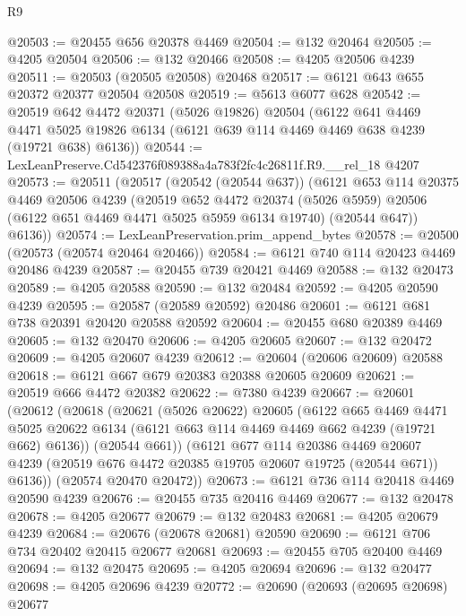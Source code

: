\begin{lexlean}{R9}
\begin{coremodule}
@20503 := @20455 @656 @20378 @4469
@20504 := @132 @20464
@20505 := @4205 @20504
@20506 := @132 @20466
@20508 := @4205 @20506 @4239
@20511 := @20503 (@20505 @20508) @20468
@20517 := @6121 @643 @655 @20372 @20377 @20504 @20508
@20519 := @5613 @6077 @628
@20542 := @20519
    @642
    @4472
    @20371
    (@5026 @19826)
    @20504
    (@6122
      @641
      @4469
      @4471
      @5025
      @19826
      @6134
      (@6121 @639 @114 @4469 @4469 @638 @4239 (@19721 @638) @6136))
@20544 := LexLeanPreserve.Cd542376f089388a4a783f2fc4c26811f.R9.__rel_18 @4207
@20573 := @20511
    (@20517
      (@20542 (@20544 @637))
      (@6121
        @653
        @114
        @20375
        @4469
        @20506
        @4239
        (@20519
          @652
          @4472
          @20374
          (@5026 @5959)
          @20506
          (@6122 @651 @4469 @4471 @5025 @5959 @6134 @19740)
          (@20544 @647))
        @6136))
@20574 := LexLeanPreservation.prim_append_bytes
@20578 := @20500 (@20573 (@20574 @20464 @20466))
@20584 := @6121 @740 @114 @20423 @4469 @20486 @4239
@20587 := @20455 @739 @20421 @4469
@20588 := @132 @20473
@20589 := @4205 @20588
@20590 := @132 @20484
@20592 := @4205 @20590 @4239
@20595 := @20587 (@20589 @20592) @20486
@20601 := @6121 @681 @738 @20391 @20420 @20588 @20592
@20604 := @20455 @680 @20389 @4469
@20605 := @132 @20470
@20606 := @4205 @20605
@20607 := @132 @20472
@20609 := @4205 @20607 @4239
@20612 := @20604 (@20606 @20609) @20588
@20618 := @6121 @667 @679 @20383 @20388 @20605 @20609
@20621 := @20519 @666 @4472 @20382
@20622 := @7380 @4239
@20667 := @20601
    (@20612
      (@20618
        (@20621
          (@5026 @20622)
          @20605
          (@6122
            @665
            @4469
            @4471
            @5025
            @20622
            @6134
            (@6121 @663 @114 @4469 @4469 @662 @4239 (@19721 @662) @6136))
          (@20544 @661))
        (@6121
          @677
          @114
          @20386
          @4469
          @20607
          @4239
          (@20519 @676 @4472 @20385 @19705 @20607 @19725 (@20544 @671))
          @6136))
      (@20574 @20470 @20472))
@20673 := @6121 @736 @114 @20418 @4469 @20590 @4239
@20676 := @20455 @735 @20416 @4469
@20677 := @132 @20478
@20678 := @4205 @20677
@20679 := @132 @20483
@20681 := @4205 @20679 @4239
@20684 := @20676 (@20678 @20681) @20590
@20690 := @6121 @706 @734 @20402 @20415 @20677 @20681
@20693 := @20455 @705 @20400 @4469
@20694 := @132 @20475
@20695 := @4205 @20694
@20696 := @132 @20477
@20698 := @4205 @20696 @4239
@20772 := @20690
    (@20693
      (@20695 @20698)
      @20677

\end{coremodule}
\end{lexlean}
